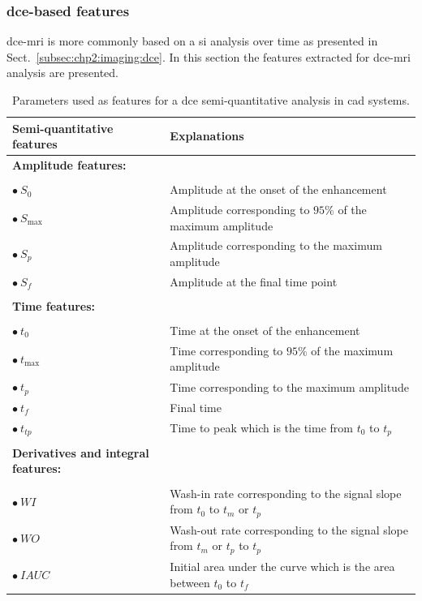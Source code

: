 \subsubsection{\Ac{dce}-based features}\label{subsubsec:chp3:img-clas:CADX-fea-dec:DCE-fea}

\ac{dce}-\ac{mri} is more commonly based on a \ac{si} analysis over time as presented in Sect.~\ref{subsec:chp2:imaging:dce}.
In this section the features extracted for \ac{dce}-\ac{mri} analysis are presented.

\begin{table}
  \caption{Parameters used as features for a \acs*{dce} semi-quantitative analysis in \acs*{cad} systems.}
  \scriptsize
  \centering
  \begin{tabularx}{\textwidth}{l X}
    \toprule
    \textbf{Semi-quantitative features} & \textbf{Explanations} \\
    \midrule
    \textbf{Amplitude features:} & \\ \\ [-1.5ex]
    \quad $\bullet\ S_0$ & Amplitude at the onset of the enhancement \\
    \quad $\bullet\ S_{\max}$ & Amplitude corresponding to $95\%$ of the maximum amplitude \\
    \quad $\bullet\ S_{p}$ & Amplitude corresponding to the maximum amplitude \\
    \quad $\bullet\ S_f$ & Amplitude at the final time point \\ \\ [-1.5ex]
    \textbf{Time features:} & \\ \\ [-1.5ex]
    \quad $\bullet\ t_0$ & Time at the onset of the enhancement \\
    \quad $\bullet\ t_{\max}$ & Time corresponding to $95\%$ of the maximum amplitude \\
    \quad $\bullet\ t_{p}$ & Time corresponding to the maximum amplitude \\
    \quad $\bullet\ t_{f}$ & Final time \\
    \quad $\bullet\ t_{tp}$ & Time to peak which is the time from $t_0$ to $t_p$ \\ \\ [-1.5ex]
    \textbf{Derivatives and integral features:} & \\ \\ [-1.5ex]
    \quad $\bullet\ WI$ & Wash-in rate corresponding to the signal slope from $t_0$ to $t_m$ or $t_p$ \\
    \quad $\bullet\ WO$ & Wash-out rate corresponding to the signal slope from $t_m$ or $t_p$ to $t_p$ \\
    \quad $\bullet\ IAUC$ & Initial area under the curve which is the area between $t_0$ to $t_{f}$ \\
    \bottomrule
  \end{tabularx}
\label{tab:semiqua}
\end{table}


